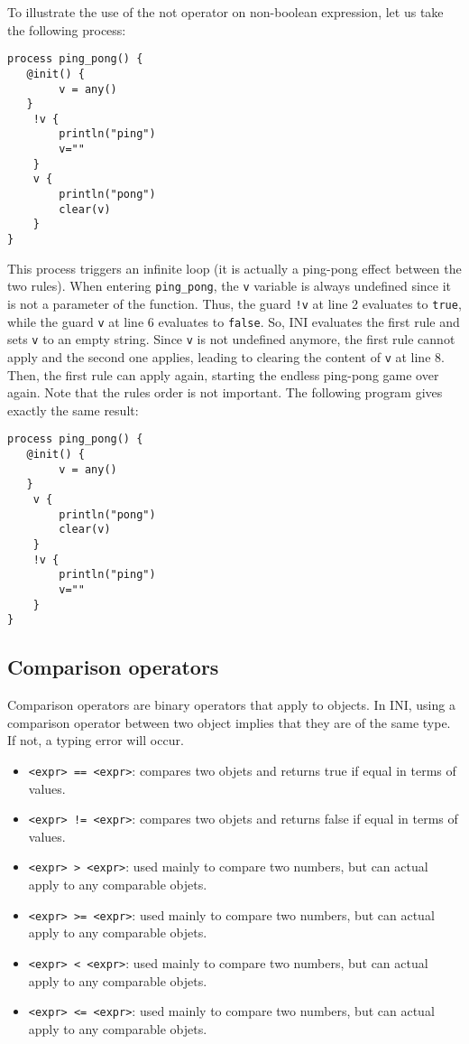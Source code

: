 \documentclass[11pt]{report}
\begin{document}
To illustrate the use of the not operator on non-boolean expression, let us take the following process:

\begin{lstlisting}
process ping_pong() {
   @init() {
		v = any()   
   }
	!v {
		println("ping")
		v=""
	}
	v {
		println("pong")
		clear(v)
	}
}
\end{lstlisting}

This process triggers an infinite loop (it is actually a ping-pong effect between the two rules). When entering \texttt{ping\_pong}, the \texttt{v} variable is always undefined since it is not a parameter of the function. Thus, the guard \texttt{!v} at line 2 evaluates to \texttt{true}, while the guard \texttt{v} at line 6 evaluates to \texttt{false}. So, INI evaluates the first rule and sets \texttt{v} to an empty string. Since \texttt{v} is not undefined anymore, the first rule cannot apply and the second one applies, leading to clearing the content of \texttt{v} at line 8. Then, the first rule can apply again, starting the endless ping-pong game over again. Note that the rules order is not important. The following program gives exactly the same result:

\begin{lstlisting}
process ping_pong() {
   @init() {
		v = any()   
   }
	v {
		println("pong")
		clear(v)
	}
	!v {
		println("ping")
		v=""
	}
}
\end{lstlisting}

\subsection{Comparison operators}

Comparison operators are binary operators that apply to objects. In INI, using a comparison operator between two object implies that they are of the same type. If not, a typing error will occur.

\begin{itemize}
\item \texttt{<expr> == <expr>}: compares two objets and returns true if equal in terms of values.
\item \texttt{<expr> != <expr>}: compares two objets and returns false if equal in terms of values.
\item \texttt{<expr> > <expr>}: used mainly to compare two numbers, but can actual apply to any comparable objets.
\item \texttt{<expr> >= <expr>}: used mainly to compare two numbers, but can actual apply to any comparable objets.
\item \texttt{<expr> < <expr>}: used mainly to compare two numbers, but can actual apply to any comparable objets.
\item \texttt{<expr> <= <expr>}: used mainly to compare two numbers, but can actual apply to any comparable objets.
\end{itemize}
\end{document}
